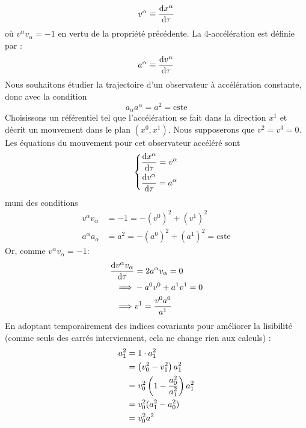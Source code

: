 {\begin{equation}
    v^\alpha \equiv \frac{\mathrm{d} x^\alpha}{\mathrm{d} \tau}
\end{equation}
où $v^{\alpha} v_{\alpha} = -1$ en vertu de la propriété précédente. La 4-accélération est définie par :
\begin{equation*}
    a^{\alpha} \equiv \frac{\mathrm{d} v^{\alpha}}{\mathrm{d} \tau}
\end{equation*}
Nous souhaitons étudier la trajectoire d'un observateur à accélération constante, donc avec la condition 
\begin{equation*}
    a_{\alpha}a^{\alpha} = a^{2} = \text{cste}
\end{equation*}
Choisissons un référentiel tel que l'accélération se fait dans la direction $x^{1}$ et décrit un mouvement dans le plan $(x^{0}, x^{1})$. Nous supposerons que $v^2 = v^3 = 0$. Les équations du mouvement pour cet observateur accéléré sont
\begin{align}
    \begin{dcases}
        \dfrac{\mathrm{d} x^{\alpha}}{\mathrm{d} \tau} = v ^{\alpha}\\
        \dfrac{\mathrm{d} v^{\alpha}}{\mathrm{d} \tau} = a^{\alpha}
    \end{dcases}
\end{align}
muni des conditions
\begin{align}
    v^{\alpha}v_{\alpha} & = -1 = -(v^{0})^2 + (v^{1})^2\\
    a^{\alpha}a_{\alpha} & = a^2 = -(a^{0})^2 + (a^{1})^2 = \mathrm{cste}
\end{align}
Or, comme $v^{\alpha}v_{\alpha} = -1$:
\begin{align}
    \frac{\mathrm{d} v^\alpha v_\alpha}{\mathrm{d} \tau} &= 2 a^{\alpha}v_{\alpha} = 0 \\
    \implies &-a^{0}v^{0} + a^{1}v^{1} = 0\\
    \label{eq:2.57}
    \implies &v^{1} = \frac{v^{0}a^{0}}{a^{1}}
\end{align}
En adoptant temporairement des indices covariants pour améliorer la lisibilité (comme seuls des carrés interviennent, cela ne change rien aux calculs) :
\begin{align}
    a_1^2 &= 1 \cdot a_1^2\\
    &= \left( v_0^2 - v_{1}^2 \right) a_{1}^2\\
    &= v_{0}^2 \left( 1 - \frac{a_0^2}{a_1^2} \right) a_1^2\\
    &= v_{0}^2(a_{1}^2 - a_{0}^2)\\
    &= v_{0}^2 a^2
\end{align}
}
